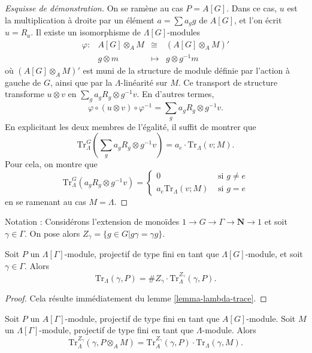 \begin{proof}[Esquisse de démonstration]
On se ramène au cas $P=A[G]$. Dans ce cas, $u$ est la multiplication à droite par un
élément $a = \sum a_gg$ de $A[G]$, et l'on écrit $u = R_a$. Il existe un
isomorphisme de $\Lambda[G]$-modules
$$
\begin{matrix}
\varphi : & A[G]\otimes_A M & \cong & \left(A[G]\otimes_A M\right)'\\
& g \otimes m & \longmapsto & g \otimes g^{-1}m
\end{matrix}
$$
où $\left(A[G]\otimes_A M\right)'$ est muni de la structure de module définie par
l'action à gauche de $G$, ainsi que par la $\Lambda$-linéarité sur $M$. Ce transport
de structure transforme $u \otimes v$ en $\sum_ga_gR_g \otimes g^{-1}v$. En d'autres
termes,
$$
\varphi \circ (u \otimes v) \circ \varphi^{-1}
=
\sum_ga_gR_g \otimes g^{-1}v.
$$
En explicitant les deux membres de l'égalité, il suffit de montrer que
$$
\text{Tr}_\Lambda^G\left(\sum_g a_gR_g \otimes g^{-1}v\right) = a_e\cdot
\text{Tr}_\Lambda(v; M).
$$
Pour cela, on montre que
$$
\text{Tr}_\Lambda^G\left(a_gR_g \otimes g^{-1}v\right) =
\left\{
\begin{matrix}
0 & \text{ si } g\neq e\\
a_e\text{Tr}_\Lambda\left(v; M\right) & \text{ si }g = e
\end{matrix}
\right.
$$
en se ramenant au cas $M=\Lambda$.
\end{proof}

\noindent
Notation :
Considérons l'extension de monoïdes $1 \to G\to \Gamma\to \mathbf{N} \to 1$ et soit
$\gamma\in \Gamma$.
On pose alors $Z_\gamma = \{g\in G | g\gamma = \gamma g\}$.

\begin{lemma}
\label{lemma-gamma-z-gamma-trace}
Soit $P$ un $\Lambda[\Gamma]$-module, projectif de type fini en tant que
$\Lambda[G]$-module, et soit $\gamma \in \Gamma$. Alors
$$
\text{Tr}_{\Lambda}(\gamma, P) =
\# Z_\gamma \cdot \text{Tr}_\Lambda^{Z_\gamma}\left(\gamma, P\right).
$$
\end{lemma}

\begin{proof}
Cela résulte immédiatement du lemme \ref{lemma-lambda-trace}.
\end{proof}

\begin{lemma}
\label{lemma-weak-trace}
Soit $P$ un $A[\Gamma]$-module, projectif de type fini en tant que $A[G]$-module. Soit $M$
un $\Lambda[\Gamma]$-module, projectif de type fini en tant que $\Lambda$-module. Alors
$$
\text{Tr}_{\Lambda}^{Z_\gamma}(\gamma, P \otimes_A M) =
\text{Tr}_A^{Z_\gamma}(\gamma, P)\cdot \text{Tr}_\Lambda(\gamma, M).
$$
\end{lemma}

